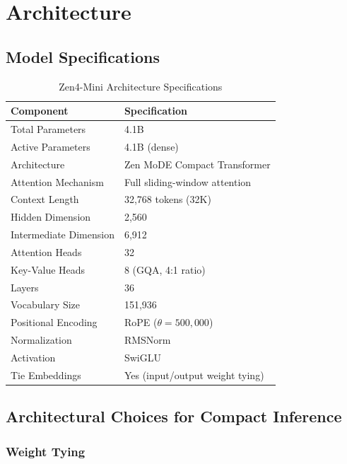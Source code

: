 \documentclass[11pt,a4paper]{article}
\begin{document}
\section{Architecture}

\subsection{Model Specifications}

\begin{table}[H]
\centering
\begin{tabular}{ll}
\toprule
\textbf{Component} & \textbf{Specification} \\
\midrule
Total Parameters         & 4.1B \\
Active Parameters        & 4.1B (dense) \\
Architecture             & Zen MoDE Compact Transformer \\
Attention Mechanism      & Full sliding-window attention \\
Context Length           & 32,768 tokens (32K) \\
Hidden Dimension         & 2,560 \\
Intermediate Dimension   & 6,912 \\
Attention Heads          & 32 \\
Key-Value Heads          & 8 (GQA, 4:1 ratio) \\
Layers                   & 36 \\
Vocabulary Size          & 151,936 \\
Positional Encoding      & RoPE ($\theta = 500{,}000$) \\
Normalization            & RMSNorm \\
Activation               & SwiGLU \\
Tie Embeddings           & Yes (input/output weight tying) \\
\bottomrule
\end{tabular}
\caption{Zen4-Mini Architecture Specifications}
\end{table}

\subsection{Architectural Choices for Compact Inference}

\subsubsection{Weight Tying}
\end{document}

